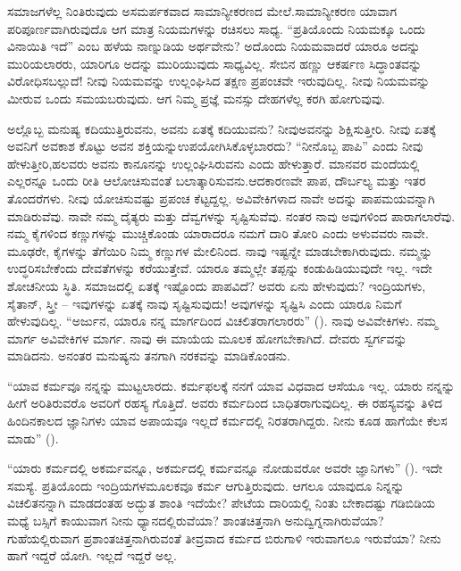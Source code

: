 ಸಮಾಜಗಳೆಲ್ಲ ನಿಂತಿರುವುದು ಅಸಮರ್ಪಕವಾದ ಸಾಮಾನ್ಯೀಕರಣದ ಮೇಲೆ.\break ಸಾಮಾನ್ಯೀಕರಣ ಯಾವಾಗ ಪರಿಪೂರ್ಣವಾಗಿರುವುದೊ ಆಗ ಮಾತ್ರ ನಿಯಮಗಳನ್ನು ರಚಿಸಲು ಸಾಧ್ಯ. “ಪ್ರತಿಯೊಂದು ನಿಯಮಕ್ಕೂ ಒಂದು ವಿನಾಯಿತಿ ಇದೆ” ಎಂಬ ಹಳೆಯ ನಾಣ್ನುಡಿಯ ಅರ್ಥವೇನು? ಅದೊಂದು ನಿಯಮವಾದರೆ ಯಾರೂ ಅದನ್ನು ಮುರಿಯಲಾರರು, ಯಾರಿಗೂ ಅದನ್ನು ಮುರಿಯುವುದು ಸಾಧ್ಯವಿಲ್ಲ. ಸೇಬಿನ ಹಣ್ಣು ಆಕರ್ಷಣ ಸಿದ್ಧಾಂತವನ್ನು ವಿರೋಧಿಸಬಲ್ಲುದೆ! ನೀವು ನಿಯಮವನ್ನು ಉಲ್ಲಂಘಿಸಿದ ತಕ್ಷಣ ಪ್ರಪಂಚವೇ ಇರುವುದಿಲ್ಲ. ನೀವು ನಿಯಮವನ್ನು ಮೀರುವ ಒಂದು ಸಮಯ\break ಬರುವುದು. ಆಗ ನಿಮ್ಮ ಪ್ರಜ್ಞೆ ಮನಸ್ಸು ದೇಹಗಳೆಲ್ಲ ಕರಗಿ ಹೋಗುವುವು.

ಅಲ್ಲೊಬ್ಬ ಮನುಷ್ಯ ಕದಿಯುತ್ತಿರುವನು, ಅವನು ಏತಕ್ಕೆ ಕದಿಯುವನು? ನೀವು\break ಅವನನ್ನು ಶಿಕ್ಷಿಸುತ್ತೀರಿ. ನೀವು ಏತಕ್ಕೆ ಅವನಿಗೆ ಅವಕಾಶ ಕೊಟ್ಟು ಅವನ ಶಕ್ತಿಯನ್ನು\break ಉಪಯೋಗಿಸಿಕೊಳ್ಳಬಾರದು? “ನೀನೊಬ್ಬ ಪಾಪಿ” ಎಂದು ನೀವು ಹೇಳುತ್ತೀರಿ,\break ಹಲವರು ಅವನು ಕಾನೂನನ್ನು ಉಲ್ಲಂಘಿಸಿರುವನು ಎಂದು ಹೇಳುತ್ತಾರೆ. ಮಾನವರ ಮಂದೆಯಲ್ಲಿ ಎಲ್ಲರನ್ನೂ ಒಂದು ರೀತಿ ಆಲೋಚಿಸುವಂತೆ ಬಲಾತ್ಕಾರಿಸುವನು.\break ಆದಕಾರಣವೇ ಪಾಪ, ದೌರ್ಬಲ್ಯ ಮತ್ತು ಇತರ ತೊಂದರೆಗಳು. ನೀವು ಯೋಚಿಸುವಷ್ಟು ಪ್ರಪಂಚ ಕೆಟ್ಟದ್ದಲ್ಲ. ಅವಿವೇಕಿಗಳಾದ ನಾವೇ ಅದನ್ನು ಪಾಪಮಯವನ್ನಾಗಿ ಮಾಡಿರುವೆವು. ನಾವೇ ನಮ್ಮ ದೈತ್ಯರು ಮತ್ತು ದೆವ್ವಗಳನ್ನು ಸೃಷ್ಟಿಸುವೆವು. ನಂತರ ನಾವು ಅವುಗಳಿಂದ ಪಾರಾಗಲಾರೆವು. ನಮ್ಮ ಕೈಗಳಿಂದ ಕಣ್ಣುಗಳನ್ನು ಮುಚ್ಚಿಕೊಂಡು ಯಾರಾದರೂ ನಮಗೆ ದಾರಿ ತೋರಿ ಎಂದು ಅಳುವವರು ನಾವೇ. ಮೂಢರೇ, ಕೈಗಳನ್ನು ತೆಗೆಯಿರಿ ನಿಮ್ಮ ಕಣ್ಣುಗಳ ಮೇಲಿನಿಂದ. ನಾವು ಇಷ್ಟನ್ನೇ ಮಾಡಬೇಕಾಗಿರುವುದು. ನಮ್ಮನ್ನು ಉದ್ಧರಿಸಬೇಕೆಂದು ದೇವತೆಗಳನ್ನು ಕರೆಯುತ್ತೇವೆ. ಯಾರೂ ತಮ್ಮಲ್ಲೇ ತಪ್ಪನ್ನು ಕಂಡುಹಿಡಿಯುವುದೇ ಇಲ್ಲ. ಇದೇ ಶೋಚನೀಯ ಸ್ಥಿತಿ. ಸಮಾಜದಲ್ಲಿ ಏತಕ್ಕೆ ಇಷ್ಟೊಂದು ಪಾಪವಿದೆ? ಅವರು ಏನು ಹೇಳುವುದು? ಇಂದ್ರಿಯಗಳು, ಸೈತಾನ್​, ಸ್ತ್ರೀ – ಇವುಗಳನ್ನು ಏತಕ್ಕೆ ನಾವು ಸೃಷ್ಟಿಸುವುದು! ಅವುಗಳನ್ನು ಸೃಷ್ಟಿಸಿ ಎಂದು ಯಾರೂ ನಿಮಗೆ ಹೇಳುವುದಿಲ್ಲ. “ಅರ್ಜುನ, ಯಾರೂ ನನ್ನ ಮಾರ್ಗದಿಂದ ವಿಚಲಿತರಾಗಲಾರರು” (). ನಾವು ಅವಿವೇಕಿಗಳು. ನಮ್ಮ ಮಾರ್ಗ ಅವಿವೇಕಿಗಳ ಮಾರ್ಗ. ನಾವು ಈ ಮಾಯೆಯ ಮೂಲಕ ಹೋಗಬೇಕಾಗಿದೆ. ದೇವರು ಸ್ವರ್ಗವನ್ನು ಮಾಡಿದನು. ಅನಂತರ ಮನುಷ್ಯನು ತನಗಾಗಿ ನರಕವನ್ನು ಮಾಡಿಕೊಂಡನು.

“ಯಾವ ಕರ್ಮವೂ ನನ್ನನ್ನು ಮುಟ್ಟಲಾರದು. ಕರ್ಮಫಲಕ್ಕೆ ನನಗೆ ಯಾವ ವಿಧವಾದ ಆಸೆಯೂ ಇಲ್ಲ. ಯಾರು ನನ್ನನ್ನು ಹೀಗೆ ಅರಿತಿರುವರೊ ಅವರಿಗೆ ರಹಸ್ಯ ಗೊತ್ತಿದೆ. ಅವರು ಕರ್ಮದಿಂದ ಬಾಧಿತರಾಗುವುದಿಲ್ಲ. ಈ ರಹಸ್ಯವನ್ನು ತಿಳಿದ ಹಿಂದಿನಕಾಲದ ಜ್ಞಾನಿಗಳು ಯಾವ ಅಪಾಯವೂ ಇಲ್ಲದೆ ಕರ್ಮದಲ್ಲಿ ನಿರತರಾಗಿದ್ದರು. ನೀನು ಕೂಡ ಹಾಗೆಯೇ ಕೆಲಸ ಮಾಡು” ().

“ಯಾರು ಕರ್ಮದಲ್ಲಿ ಅಕರ್ಮವನ್ನೂ, ಅಕರ್ಮದಲ್ಲಿ ಕರ್ಮವನ್ನೂ ನೋಡುವರೋ ಅವರೇ ಜ್ಞಾನಿಗಳು” (). ಇದೇ ಸಮಸ್ಯೆ. ಪ್ರತಿಯೊಂದು ಇಂದ್ರಿಯಗಳ\break ಮೂಲಕವೂ ಕರ್ಮ ಆಗುತ್ತಿರುವುದು. ಆಗಲೂ ಯಾವುದೂ ನಿನ್ನನ್ನು ವಿಚಲಿತನನ್ನಾಗಿ ಮಾಡದಂತಹ ಅದ್ಭುತ ಶಾಂತಿ ಇದೆಯೇ? ಪೇಟೆಯ ದಾರಿಯಲ್ಲಿ ನಿಂತು ಬೇಕಾದಷ್ಟು ಗಡಿಬಿಡಿಯ ಮಧ್ಯೆ ಬಸ್ಸಿಗೆ ಕಾಯುವಾಗ ನೀನು ಧ್ಯಾನದಲ್ಲಿರುವೆಯಾ? ಶಾಂತಚಿತ್ತನಾಗಿ ಅನುದ್ವಿಗ್ನನಾಗಿರುವೆಯಾ? ಗುಹೆಯಲ್ಲಿರುವಾಗ ಪ್ರಶಾಂತಚಿತ್ತನಾಗಿರುವಂತೆ ತೀವ್ರವಾದ ಕರ್ಮದ ಬಿರುಗಾಳಿ ಇರುವಾಗಲೂ ಇರುವೆಯಾ? ನೀನು ಹಾಗೆ ಇದ್ದರೆ ಯೋಗಿ. ಇಲ್ಲದೆ ಇದ್ದರೆ ಅಲ್ಲ.

